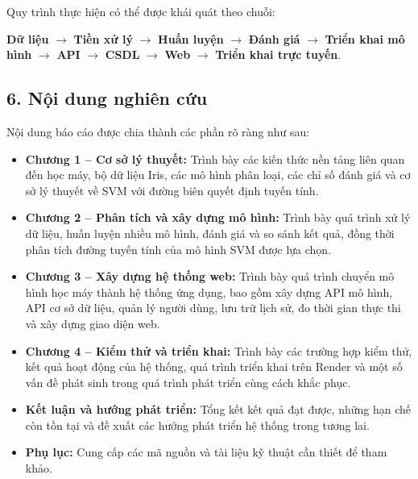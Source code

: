\documentclass[14pt]{extarticle}
\begin{document}
		   Quy trình thực hiện có thể được khái quát theo chuỗi:
		   
		   \begin{center}
		   	\textbf{Dữ liệu}
		   	$\rightarrow$
		   	\textbf{Tiền xử lý}
		   	$\rightarrow$
		   	\textbf{Huấn luyện}
		   	$\rightarrow$
		   	\textbf{Đánh giá}
		   	$\rightarrow$
		   	\textbf{Triển khai mô hình}
		   	$\rightarrow$
		   	\textbf{API}
		   	$\rightarrow$
		   	\textbf{CSDL}
		   	$\rightarrow$
		   	\textbf{Web}
		   	$\rightarrow$
		   	\textbf{Triển khai trực tuyến}.
		   \end{center}
		   
		   
\subsection*{6. Nội dung nghiên cứu}
		 \noindent Nội dung báo cáo được chia thành các phần rõ ràng như sau:
	
	\begin{itemize}
	
		\item \textbf{Chương 1 -- Cơ sở lý thuyết:} Trình bày các kiến thức nền tảng liên quan đến học máy, bộ dữ liệu Iris, các mô hình phân loại, các chỉ số đánh giá và cơ sở lý thuyết về SVM với đường biên quyết định tuyến tính.
		
		\item \textbf{Chương 2 -- Phân tích và xây dựng mô hình:} Trình bày quá trình xử lý dữ liệu, huấn luyện nhiều mô hình, đánh giá và so sánh kết quả, đồng thời phân tích đường tuyến tính của mô hình SVM được lựa chọn.
		
		\item \textbf{Chương 3 -- Xây dựng hệ thống web:} Trình bày quá trình chuyển mô hình học máy thành hệ thống ứng dụng, bao gồm xây dựng API mô hình, API cơ sở dữ liệu, quản lý người dùng, lưu trữ lịch sử, đo thời gian thực thi và xây dựng giao diện web.
		
		\item \textbf{Chương 4 -- Kiểm thử và triển khai:} Trình bày các trường hợp kiểm thử, kết quả hoạt động của hệ thống, quá trình triển khai trên Render và một số vấn đề phát sinh trong quá trình phát triển cùng cách khắc phục.
		
		\item \textbf{Kết luận và hướng phát triển:} Tổng kết kết quả đạt được, những hạn chế còn tồn tại và đề xuất các hướng phát triển hệ thống trong tương lai.
		
		\item \textbf{Phụ lục:} Cung cấp các mã nguồn và tài liệu kỹ thuật cần thiết để tham khảo.
		
	\end{itemize}
		 \newpage
		 
\end{document}
